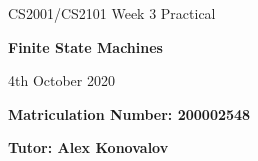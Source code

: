 \documentclass{article}
\begin{document}
\nocite{*}

\begin{center}
\Huge 
CS2001/CS2101 Week 3 Practical

\vspace{0.5cm}

\textbf{Finite State Machines}

\vspace{1cm}
\LARGE
4th October 2020

\large
\vspace{1.5cm}

\textbf{Matriculation Number: 200002548}

\vspace{0.5cm}

\textbf{Tutor: Alex Konovalov}

\end{center}

\vspace*{3cm}

\tableofcontents

\newpage
\end{document}
